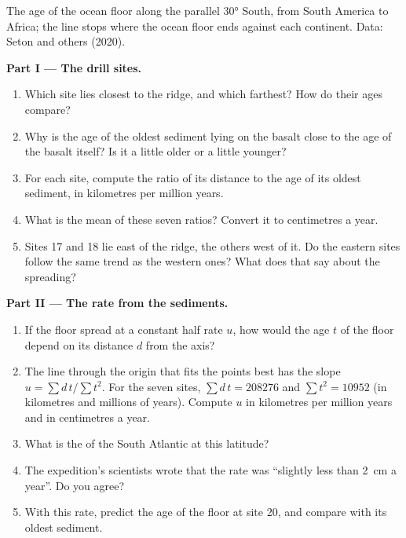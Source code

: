 \begin{problem}
\begin{center}
{\small The age of the ocean floor along the parallel \ang{30} South, from
South America to Africa; the line stops where the ocean floor ends against
each continent. Data: Seton and others (2020).}
\end{center}

\medskip
\noindent\textbf{Part I --- The drill sites.}
\begin{enumerate}
  \item Which site lies closest to the ridge, and which farthest? How do
        their ages compare?
  \item Why is the age of the oldest sediment lying on the basalt close to
        the age of the basalt itself? Is it a little older or a little
        younger?
  \item For each site, compute the ratio of its distance to the age of its
        oldest sediment, in kilometres per million years.
  \item What is the mean of these seven ratios? Convert it to centimetres a
        year.
  \item Sites 17 and 18 lie east of the ridge, the others west of it. Do the
        eastern sites follow the same trend as the western ones? What does
        that say about the spreading?
\end{enumerate}

\medskip
\noindent\textbf{Part II --- The rate from the sediments.}
\begin{enumerate}[resume]
  \item If the floor spread at a constant half rate $u$, how would the age
        $t$ of the floor depend on its distance $d$ from the axis?
  \item The line through the origin that fits the points best has the slope
        $u = \sum d\,t / \sum t^2$. For the seven sites,
        $\sum d\,t = \num{208276}$ and $\sum t^2 = \num{10952}$ (in
        kilometres and millions of years). Compute $u$ in kilometres per
        million years and in centimetres a year.
  \item What is the  of the South Atlantic at this
        latitude?
  \item The expedition's scientists wrote that the rate was ``slightly less
        than \qty{2}{cm} a year''. Do you agree?
  \item With this rate, predict the age of the floor at site 20, and compare
        with its oldest sediment.
\end{enumerate}


\end{problem}
